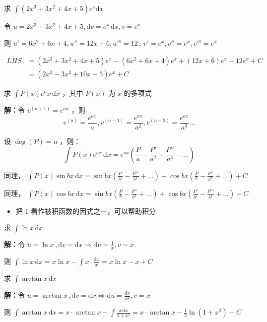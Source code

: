 \begin{example}{}
求 $\displaystyle{\int\left(2x^3+3x^2+4x+5\right)e^x\mathrm {d}x}$ 

令 $\displaystyle{u=2x^3+3x^2+4x+5,\mathrm{d}v=e^x\,\mathrm{d}x,v=e^x}$

则 $\displaystyle{u'=6x^2+6x+4,u''=12x+6,u'''=12\,;\,v'=e^x,v''=e^x,v'''=e^x}$ 

\begin{equation}
\begin{aligned}
LHS&=(2x^3+3x^2+4x+5)e^x-(6x^2+6x+4)e^x+(12x+6)e^x-12e^x+C \\
&=(2x^3-3x^2+10x-5)e^x+C
\end{aligned}
\end{equation}

\end{example}
\begin{corollary}{}
求 $\displaystyle{\int P(x)e^ax\,\mathrm{d}x}$ ，其中 $P(x)$ 为 $x$ 的多项式

\textbf{解：}令 $v^{(n+1)}=e^{ax}$ ，则
$$v^{(n)}=\frac{e^{ax}}{a},v^{(n-1)}=\frac{e^{ax}}{a^2},v^{(n-2)}=\frac{e^{ax}}{a^3}...$$ 

设 $\deg (P)=n$ ，则：
$$\int P(x)e^{ax}\,\mathrm{d}x=e^{ax}\left(\frac{P}{a}-\frac{P'}{a^2}+\frac{P''}{a^3}-...\right)$$

同理， $\displaystyle{\int P(x)\sin bx\,\mathrm{d}x=\sin bx\left(\frac{P'}{b^2}-\frac{P'''}{b^4}+...\right)-\cos bx\left(\frac{P}{b}-\frac{P''}{b^3}+...\right)+C}$

同理， $\displaystyle{\int P(x)\cos bx\,\mathrm{d}x=\sin bx\left(\frac{P}{b}-\frac{P''}{b^3}+...\right)+\cos bx\left(\frac{P'}{b^2}-\frac{P'''}{b^4}+...\right)+C}$
\end{corollary}
\begin{itemize}
\item 把 1 看作被积函数的因式之一，可以帮助积分
\end{itemize}
\begin{corollary}{}
求 $\displaystyle{\int \ln x\,\mathrm{d}x}$

\textbf{解：}令 $\displaystyle{u=\ln x\,,\mathrm{d}v=\mathrm{d}x\Rightarrow \mathrm{d}u=\frac{1}{x},v=x}$ 

则 $\displaystyle{\int \ln x\,\mathrm{d}x=x\ln x-\int x\cdot\frac{\mathrm{d}x}x=x\ln x-x+C}$
\end{corollary}
\begin{corollary}{}
求 $\displaystyle{\int\arctan x\,\mathrm{d}x}$

\textbf{解：}令 $\displaystyle{u=\arctan x\,,\mathrm{d}v=\mathrm{d}x\Rightarrow \mathrm{d}u=\frac{\mathrm{d}x}{x^2},v=x}$

则 $\displaystyle{\int\arctan x\,\mathrm{d}x=x\cdot \arctan x-\int\frac{x\,\mathrm{d}x}{1+x^2}=x\cdot \arctan x-\frac{1}{2}\ln\left(1+x^2\right)+C}$ 
\end{corollary}
